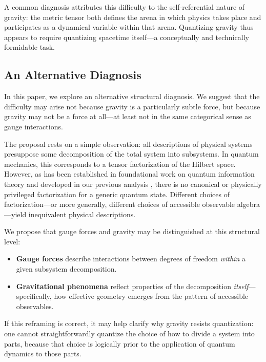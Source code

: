 \documentclass[12pt,a4paper,openany]{book}
\begin{document}
A common diagnosis attributes this difficulty to the self-referential nature of gravity: the metric tensor both defines the arena in which physics takes place and participates as a dynamical variable within that arena. Quantizing gravity thus appears to require quantizing spacetime itself—a conceptually and technically formidable task.

\subsection{An Alternative Diagnosis}

In this paper, we explore an alternative structural diagnosis. We suggest that the difficulty may arise not because gravity is a particularly subtle force, but because gravity may not be a force at all—at least not in the same categorical sense as gauge interactions.

The proposal rests on a simple observation: all descriptions of physical systems presuppose some decomposition of the total system into subsystems. In quantum mechanics, this corresponds to a tensor factorization of the Hilbert space. However, as has been established in foundational work on quantum information theory \cite{Zanardi2001,Zanardi2004} and developed in our previous analysis \cite{Liu2026PaperA}, there is no canonical or physically privileged factorization for a generic quantum state. Different choices of factorization—or more generally, different choices of accessible observable algebra—yield inequivalent physical descriptions.

We propose that gauge forces and gravity may be distinguished at this structural level:

\begin{sloppypar}
\begin{itemize}
    \item \textbf{Gauge forces} describe interactions between degrees of freedom \emph{within} a given subsystem decomposition.
    \item \textbf{Gravitational phenomena} reflect properties of the decomposition \emph{itself}---specifically, how effective geometry emerges from the pattern of accessible observables.
\end{itemize}
\end{sloppypar}

If this reframing is correct, it may help clarify why gravity resists quantization: one cannot straightforwardly quantize the choice of how to divide a system into parts, because that choice is logically prior to the application of quantum dynamics to those parts.
\end{document}
